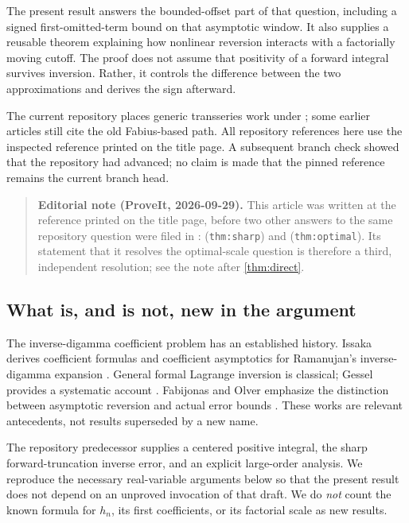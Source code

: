 \documentclass[11pt,a4paper]{article}
\theoremstyle{definition}
\numberwithin{equation}{section}
\begin{document}
The present result answers the bounded-offset part of that question, including a signed first-omitted-term bound on that asymptotic window. It also supplies a reusable theorem explaining how nonlinear reversion interacts with a factorially moving cutoff. The proof does not assume that positivity of a forward integral survives inversion. Rather, it controls the difference between the two approximations and derives the sign afterward.

The current repository places generic transseries work under ; some earlier articles still cite the old Fabius-based path. All repository references here use the inspected reference printed on the title page. A subsequent branch check showed that the repository had advanced; no claim is made that the pinned reference remains the current branch head.

\begin{quote}\small\textbf{Editorial note (ProveIt, 2026-09-29).} This article was written at the reference printed on the title page, before two other answers to the same repository question were filed in :  (\texttt{thm:sharp}) and  (\texttt{thm:optimal}). Its statement that it resolves the optimal-scale question is therefore a third, independent resolution; see the note after \cref{thm:direct}.\end{quote}

\subsection{What is, and is not, new in the argument}
The inverse-digamma coefficient problem has an established history. Issaka derives coefficient formulas and coefficient asymptotics for Ramanujan's inverse-digamma expansion \cite{issaka,thesis}. General formal Lagrange inversion is classical; Gessel provides a systematic account \cite{gessel}. Fabijonas and Olver emphasize the distinction between asymptotic reversion and actual error bounds \cite{fo}. These works are relevant antecedents, not results superseded by a new name.

The repository predecessor supplies a centered positive integral, the sharp forward-truncation inverse error, and an explicit large-order analysis. We reproduce the necessary real-variable arguments below so that the present result does not depend on an unproved invocation of that draft. We do \emph{not} count the known formula for $h_n$, its first coefficients, or its factorial scale as new results.
\end{document}

